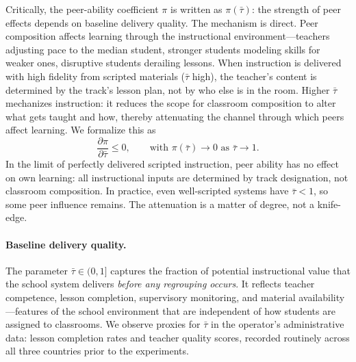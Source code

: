 \documentclass[11pt]{article}
\begin{document}
Critically, the peer-ability coefficient $\pi$ is written as $\pi(\bar{\tau})$: the strength of peer effects depends on baseline delivery quality. The mechanism is direct. Peer composition affects learning through the instructional environment---teachers adjusting pace to the median student, stronger students modeling skills for weaker ones, disruptive students derailing lessons. When instruction is delivered with high fidelity from scripted materials ($\bar{\tau}$ high), the teacher's content is determined by the track's lesson plan, not by who else is in the room. Higher $\bar{\tau}$ mechanizes instruction: it reduces the scope for classroom composition to alter what gets taught and how, thereby attenuating the channel through which peers affect learning. We formalize this as
\begin{equation}
\label{eq:pi_tau}
\frac{\partial \pi}{\partial \bar{\tau}} \leq 0, \qquad \text{with } \pi(\bar{\tau}) \to 0 \text{ as } \bar{\tau} \to 1.
\end{equation}
In the limit of perfectly delivered scripted instruction, peer ability has no effect on own learning: all instructional inputs are determined by track designation, not classroom composition. In practice, even well-scripted systems have $\bar{\tau} < 1$, so some peer influence remains. The attenuation is a matter of degree, not a knife-edge.

\paragraph{Baseline delivery quality.} The parameter $\bar{\tau} \in (0,1]$ captures the fraction of potential instructional value that the school system delivers \emph{before any regrouping occurs}. It reflects teacher competence, lesson completion, supervisory monitoring, and material availability---features of the school environment that are independent of how students are assigned to classrooms. We observe proxies for $\bar{\tau}$ in the operator's administrative data: lesson completion rates and teacher quality scores, recorded routinely across all three countries prior to the experiments.
\end{document}
